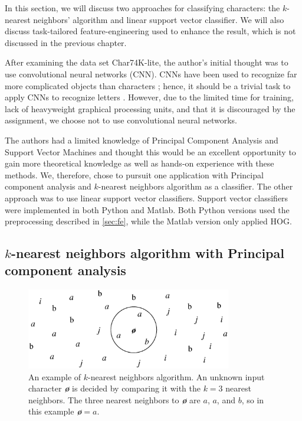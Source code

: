 \documentclass[../main.tex]{subfiles}
\begin{document}
In this section, we will discuss two approaches for classifying characters: the $k$-nearest neighbors' algorithm and linear support vector classifier. We will also discuss task-tailored feature-engineering used to enhance the result, which is not discussed in the previous chapter. 

After examining the data set Char74K-lite, the author's initial thought was to use convolutional neural networks (CNN). CNNs have been used to recognize far more complicated objects than characters \cite{cnn_1}; hence, it should be a trivial task to apply CNNs to recognize letters \cite{cnn_2}. However, due to the limited time for training, lack of heavyweight graphical processing units, and that it is discouraged by the assignment, we choose not to use convolutional neural networks. 

The authors had a limited knowledge of Principal Component Analysis and Support Vector Machines and thought this would be an excellent opportunity to gain more theoretical knowledge as well as hands-on experience with these methods. We, therefore, chose to pursuit one application with Principal component analysis and $k$-nearest neighbors algorithm as a classifier. The other approach was to use linear support vector classifiers. Support vector classifiers were implemented in both Python and Matlab. Both Python versions used the preprocessing described in \autoref{sec:fe}, while the Matlab version only applied HOG.

\subsection{$k$-nearest neighbors algorithm with Principal component analysis}

\begin{figure}
  \centering
  \includegraphics[width=0.8\textwidth]{figures/knn-ex}
  \caption{An example of $k$-nearest neighbors algorithm. An unknown input character \textit{\textbf{\o}} is decided by comparing it with the $k=3$ nearest neighbors. The three nearest neighbors to \textit{\textbf{\o}} are $a$, $a$, and $b$, so in this example \textit{\textbf{\o}}$=a$.} 
  \label{fig:knn}
\end{figure}
\end{document}
